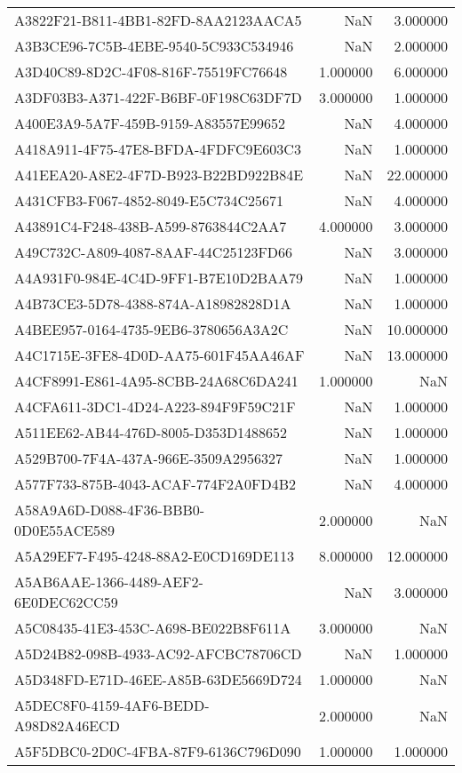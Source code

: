 \begin{tabular}{lrr}
A3822F21-B811-4BB1-82FD-8AA2123AACA5 & NaN & 3.000000 \\
A3B3CE96-7C5B-4EBE-9540-5C933C534946 & NaN & 2.000000 \\
A3D40C89-8D2C-4F08-816F-75519FC76648 & 1.000000 & 6.000000 \\
A3DF03B3-A371-422F-B6BF-0F198C63DF7D & 3.000000 & 1.000000 \\
A400E3A9-5A7F-459B-9159-A83557E99652 & NaN & 4.000000 \\
A418A911-4F75-47E8-BFDA-4FDFC9E603C3 & NaN & 1.000000 \\
A41EEA20-A8E2-4F7D-B923-B22BD922B84E & NaN & 22.000000 \\
A431CFB3-F067-4852-8049-E5C734C25671 & NaN & 4.000000 \\
A43891C4-F248-438B-A599-8763844C2AA7 & 4.000000 & 3.000000 \\
A49C732C-A809-4087-8AAF-44C25123FD66 & NaN & 3.000000 \\
A4A931F0-984E-4C4D-9FF1-B7E10D2BAA79 & NaN & 1.000000 \\
A4B73CE3-5D78-4388-874A-A18982828D1A & NaN & 1.000000 \\
A4BEE957-0164-4735-9EB6-3780656A3A2C & NaN & 10.000000 \\
A4C1715E-3FE8-4D0D-AA75-601F45AA46AF & NaN & 13.000000 \\
A4CF8991-E861-4A95-8CBB-24A68C6DA241 & 1.000000 & NaN \\
A4CFA611-3DC1-4D24-A223-894F9F59C21F & NaN & 1.000000 \\
A511EE62-AB44-476D-8005-D353D1488652 & NaN & 1.000000 \\
A529B700-7F4A-437A-966E-3509A2956327 & NaN & 1.000000 \\
A577F733-875B-4043-ACAF-774F2A0FD4B2 & NaN & 4.000000 \\
A58A9A6D-D088-4F36-BBB0-0D0E55ACE589 & 2.000000 & NaN \\
A5A29EF7-F495-4248-88A2-E0CD169DE113 & 8.000000 & 12.000000 \\
A5AB6AAE-1366-4489-AEF2-6E0DEC62CC59 & NaN & 3.000000 \\
A5C08435-41E3-453C-A698-BE022B8F611A & 3.000000 & NaN \\
A5D24B82-098B-4933-AC92-AFCBC78706CD & NaN & 1.000000 \\
A5D348FD-E71D-46EE-A85B-63DE5669D724 & 1.000000 & NaN \\
A5DEC8F0-4159-4AF6-BEDD-A98D82A46ECD & 2.000000 & NaN \\
A5F5DBC0-2D0C-4FBA-87F9-6136C796D090 & 1.000000 & 1.000000 \\

\end{tabular}
